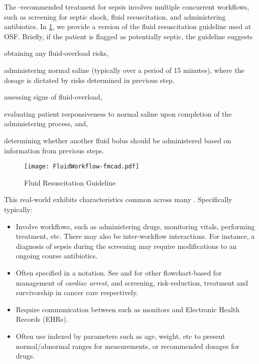 The \BPG{}-recommended treatment for
sepsis involves multiple concurrent workflows, such as
screening for septic shock, fluid resuscitation, and administering antibiotics.
In \figurename{} \ref{fig:fluid-therapy}, we provide
a version of the fluid resuscitation guideline used
at OSF. Briefly, if the patient is flagged as potentially septic, the guideline suggests
\begin{enumerate*}[label=(\roman*)]
  \item obtaining any fluid-overload risks,
  \item administering normal saline (typically over a period of 15 minutes),
    where the dosage is dictated by risks determined in previous step,
  \item assessing signs of fluid-overload,
  \item evaluating patient responsiveness to normal saline upon completion of
    the administering process, and,
  \item determining whether another fluid bolus should be administered based on
    information from previous steps.
\end{enumerate*}
\begin{figure}[b]
  \centering
  \texttt{[image: FluidWorkflow-fmcad.pdf]}
  \caption{Fluid Resuscitation Guideline}\label{fig:fluid-therapy}
\end{figure}

This real-world \BPG{} exhibits characteristics common
across many \BPGs{}. Specifically \BPGs{} typically:
\begin{itemize}
  \item Involve  workflows, such as administering drugs,
    monitoring vitals, performing treatment, etc. There may also be
    inter-workflow interactions. For instance, a diagnosis of sepsis during the
    screening may require modifications to an ongoing course antibiotics.
  \item Often specified in a 
    notation. See \cite{AHAFlowcharts} and \cite{CancerCareFlowcharts} for other flowchart-based \BPGs{} for management of \emph{cardiac arrest}, and
    screening, risk-reduction, treatment and survivorship in
    cancer care respectively.
  \item Require communication between  such as
     monitors and Electronic Health Records (EHRs).
  \item Often use  indexed by parameters such as age, weight,
    etc to present normal/abnormal ranges for measurements, or recommended dosages for drugs.
\end{itemize}

